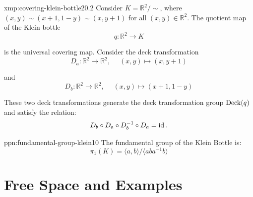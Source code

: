 \documentclass[landscape, 8pt]{extarticle}
\begin{document}
\begin{multicols*}{3}
\vspace{-7pt}
\begin{xmp}{xmp:covering-klein-bottle}{20.2}
	\vspace{-2pt}
	Consider $K = \mathbb{R}^{2} / \sim$, where $(x, y) \sim (x + 1, 1 - y) \sim (x, y+1)$ for all $(x, y)\in \mathbb{R}^{2}$. The quotient map of the Klein bottle
	\vspace{-4pt}
	\[q : \mathbb{R}^{2} \to K\]
	\par\vspace{-3pt}
	is the universal covering map. Consider the deck transformation
	\vspace{-1pt}
	\[D_{a} : \mathbb{R}^{2} \to \mathbb{R}^{2},\;\quad (x, y) \mapsto (x, y+1)\]
	\par\vspace{-3pt}
	and
	\vspace{-3pt}
	\[D_{b} : \mathbb{R}^{2} \to \mathbb{R}^{2},\;\quad (x, y) \mapsto (x+1, 1-y)\]
	\par\vspace{-3pt}
	These two deck transformations generate the deck transformation group $\operatorname{Deck}(q)$ and satisfy the relation:
	\vspace{-3pt}
	\[D_{b} \circ D_{a} \circ D_{b}^{-1} \circ D_{a} = \operatorname{id}.\]
\end{xmp}

\vspace{-7pt}
\begin{ppn}{ppn:fundamental-group-klein}{10}
	\vspace{-2pt}
	The fundamental group of the Klein Bottle is:
	\vspace{-2pt}
	\[\pi_{1}(K) = \langle a, b \rangle / \langle aba^{-1}b \rangle\]
\end{ppn}

\newpage
\section{Free Space and Examples}


\end{multicols*}
\end{document}
